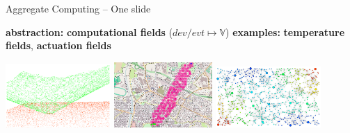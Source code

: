 \documentclass[presentation, 9pt,169]{beamer}\mode<presentation>{\usetheme{AMSBolognaFC}}
\newcommand{\lbl}[1]{\textbf{\textcolor{gray!90!white}{#1}}}
\newcommand{\bo}[1]{\textbf{#1}}
\begin{document}
\begin{frame}{Aggregate Computing -- One slide}
{  \begin{block}{} %
    \scriptsize
  \lbl{abstraction:} \bo{computational fields} ($\mathit{dev/evt} \mapsto \mathbb{V}$) \vspace{0.1cm}
    \lbl{examples:} \bo{temperature fields}, \bo{actuation fields} \vspace{0.1cm}
    \begin{center}
      \includegraphics[width=0.3\textwidth]{img/3d-gradient.png}
      \includegraphics[width=0.28\textwidth]{img/channel.png}
      \includegraphics[width=0.3\textwidth]{img/scr-result.png}
      \end{center}
  \tiny {}
  \end{block}
  }
  
\end{frame}
\end{document}
